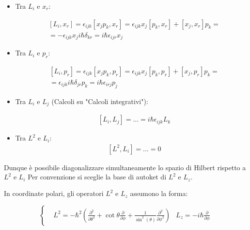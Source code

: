 \documentclass{article}
\begin{document}
\begin{itemize}
  \item Tra $L_i$ e $x_r$:

        \begin{equation}
          \begin{aligned}
             & [L_i, x_r]= \epsilon_{ijk}[x_jp_k, x_r]=\epsilon_{ijk}{x_j[p_k, x_r]+[x_j, x_r]p_k} = \\
             & = -\epsilon_{ijk}{x_ji\hbar\delta_{kr}}=i\hbar\epsilon_{ijr}x_j
          \end{aligned}
        \end{equation}
  \item Tra $L_i$ e $p_r$:

        \begin{equation}
          \begin{aligned}
             & [L_i, p_r]= \epsilon_{ijk}[x_jp_k, p_r]= \epsilon_{ijk}{x_j[p_k, p_r]+[x_j, p_r]p_k}= \\
             & = \epsilon_{ijk}{i\hbar \delta_{jr}p_k}=i\hbar\epsilon_{irj}p_j
          \end{aligned}
        \end{equation}


  \item Tra $L_i$ e $L_j$ (Calcoli su "Calcoli integrativi"):

        \begin{equation}
          \begin{aligned}
             & [L_i,L_j]=...=i\hbar\epsilon_{ijk}L_k
          \end{aligned}
        \end{equation}

  \item Tra $L^2$ e $L_i$:
        \begin{equation}
          \begin{aligned}
             & [L^2,L_i]=...=0
          \end{aligned}
        \end{equation}
\end{itemize}

Dunque è possibile diagonalizzare simultaneamente lo spazio di Hilbert rispetto a $L^2$ e $L_i$
Per convenzione si sceglie la base di autoket di $L^2$ e $L_z$.

In coordinate polari, gli operatori $L^2$ e $L_z$ assumono la forma:

\begin{equation}
  \left\{
  \begin{aligned}
     & L^2=-\hbar^2\left(\frac{\partial^2}{\partial \theta^2}+\cot{\theta}\frac{\partial}{\partial \phi}+\frac{1}{\sin^2(\theta)}\frac{\partial^2}{\partial \phi^2}\right)
     & L_z=-i\hbar\frac{\partial}{\partial \phi}
  \end{aligned}
  \right.
\end{equation}
\end{document}
